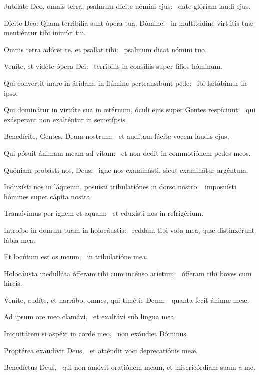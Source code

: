 \item Jubiláte Deo, omnis terra, psalmum dícite nómini ejus:~\psstar{} date glóriam laudi ejus.

\item Dícite Deo: Quam terribília sunt ópera tua, Dómine!~\psstar{} in multitúdine virtútis tuæ mentiéntur tibi inimíci tui.

\item Omnis terra adóret te, et psallat tibi:~\psstar{} psalmum dicat nómini tuo.

\item Veníte, et vidéte ópera Dei:~\psstar{} terríbilis in consíliis super fílios hóminum.

\item Qui convértit mare in áridam, in flúmine pertransíbunt pede:~\psstar{} ibi lætábimur in ipso.

\item Qui dominátur in virtúte sua in ætérnum, óculi ejus super Gentes respíciunt:~\psstar{} qui exásperant non exalténtur in semetípsis.

\item Benedícite, Gentes, Deum nostrum:~\psstar{} et audítam fácite vocem laudis ejus,

\item Qui pósuit ánimam meam ad vitam:~\psstar{} et non dedit in commotiónem pedes meos.

\item Quóniam probásti nos, Deus:~\psstar{} igne nos examinásti, sicut examinátur argéntum.

\item Induxísti nos in láqueum, posuísti tribulatiónes in dorso nostro:~\psstar{} imposuísti hómines super cápita nostra.

\item Transívimus per ignem et aquam:~\psstar{} et eduxísti nos in refrigérium.

\item Introíbo in domum tuam in holocáustis:~\psstar{} reddam tibi vota mea, quæ distinxérunt lábia mea.

\item Et locútum est os meum,~\psstar{} in tribulatióne mea.

\item Holocáusta medulláta ófferam tibi cum incénso aríetum:~\psstar{} ófferam tibi boves cum hircis.

\item Veníte, audíte, et narrábo, omnes, qui timétis Deum:~\psstar{} quanta fecit ánimæ meæ.

\item Ad ipsum ore meo clamávi,~\psstar{} et exaltávi sub lingua mea.

\item Iniquitátem si aspéxi in corde meo,~\psstar{} non exáudiet Dóminus.

\item Proptérea exaudívit Deus,~\psstar{} et atténdit voci deprecatiónis meæ.

\item Benedíctus Deus,~\psstar{} qui non amóvit oratiónem meam, et misericórdiam suam a me.


